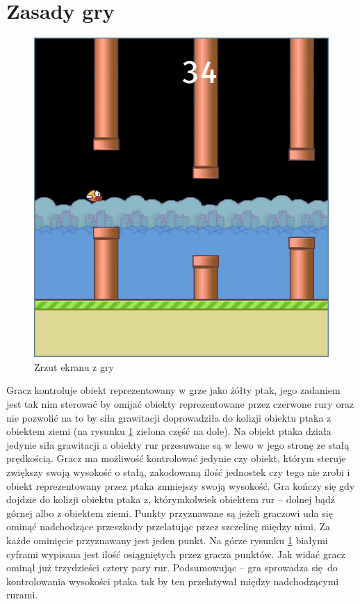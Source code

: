 \documentclass[a4paper, 12pt,oneside]{book}
\begin{document}
\section{Zasady gry} 
\begin{figure}[h] 
	\begin{center}
		\includegraphics[scale=0.40]{flappy_bird.png}
		\caption{Zrzut ekranu z gry}
		\label{flappy_screenshot}
	\end{center}
\end{figure}

Gracz kontroluje obiekt reprezentowany w grze jako żółty ptak,
jego zadaniem jest tak nim sterować by omijać obiekty reprezentowane przez 
czerwone rury oraz nie pozwolić na to by siła grawitacji doprowadziła do
kolizji obiektu ptaka z obiektem ziemi (na rysunku \ref{flappy_screenshot}
zielona część na dole). Na obiekt ptaka działa jedynie siła grawitacji a
obiekty rur przesuwane są w lewo w jego stronę ze stałą prędkością. Gracz
ma możliwość kontrolować jedynie czy obiekt, którym steruje zwiększy swoją
wysokość o stałą, zakodowaną ilość jednostek czy tego nie zrobi i obiekt
reprezentowany przez ptaka zmniejszy swoją wysokość. Gra kończy się gdy
dojdzie do kolizji obiektu ptaka z, którymkolwiek obiektem rur -- dolnej
bądź górnej albo z obiektem ziemi. Punkty przyznawane są jeżeli graczowi uda
się ominąć nadchodzące przeszkody przelatując przez szczelinę między nimi.
Za każde ominięcie przyznawany jest jeden punkt. Na górze rysunku
\ref{flappy_screenshot} białymi cyframi wypisana jest ilość osiągniętych przez
gracza punktów. Jak widać gracz ominął już trzydzieści cztery pary rur.
Podsumowując -- gra sprowadza się do kontrolowania wysokości ptaka tak by ten
przelatywał między nadchodzącymi rurami.
\end{document}
